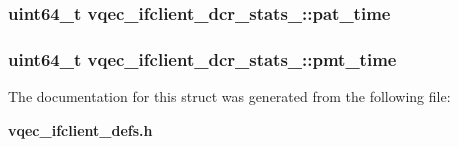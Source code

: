 \subsubsection{\setlength{\rightskip}{0pt plus 5cm}uint64\_\-t \bf{vqec\_\-ifclient\_\-dcr\_\-stats\_\-::pat\_\-time}}\label{structvqec__ifclient__dcr__stats___7b4b750430599229b9a08632bb7921aa}


\subsubsection{\setlength{\rightskip}{0pt plus 5cm}uint64\_\-t \bf{vqec\_\-ifclient\_\-dcr\_\-stats\_\-::pmt\_\-time}}\label{structvqec__ifclient__dcr__stats___1da669c7956e54909f5a953be1440eee}




The documentation for this struct was generated from the following file:\begin{CompactItemize}
\item 
\bf{vqec\_\-ifclient\_\-defs.h}\end{CompactItemize}
